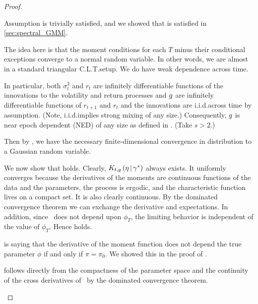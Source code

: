 \documentclass[11pt, letterpaper, twoside, final]{article}
\begin{document}
\begin{appendices}
\begin{proof}
\begin{proofpart}
\end{proofpart}

\begin{proofpart}
    \label{part:mainTheoremProofPart3}

    Assumption  is trivially satisfied,  and we showed that  is satisfied
    in \cref{sec:spectral_GMM}.  
        
    The idea here is that the moment conditions for each $T$ minus their conditional exceptions converge to a
    normal random variable.
    In other words, we are almost in a standard triangular C.L.T.\@ setup.
    We do have weak dependence across time.

    In particular, both $\sigma^2_t$ and $r_t$ are infinitely differentiable functions of the innovations to
    the volatility and return processes and $g$ are infinitely differentiable functions of $r_{t+1}$ and
    $r_t$ and the innovations are i.i.d.\@ across time by assumption.
    (Note, i.i.d.\@ implies strong mixing of any size.)
    Consequently, $g$ is near epoch dependent (NED) of any size as defined in
    \textcite{andrews1991empirical}.  
    (Take $s>2.$) 
    
    Then by \textcite[Theorem 3]{andrews1991empirical}, we have the necessary finite-dimensional convergence in
    distribution to a Gaussian random variable. 

    We now show that  holds.
    Clearly, $K_{t,g}\left(\eta \,\middle\vert\, \gamma^{*}\right)$ always exists.
    It uniformly converges because the derivatives of the moments are continuous functions of the data and the
    parameters, the process is ergodic, and the characteristic function lives on a compact set.
    It is also clearly continuous.
    By the dominated convergence theorem we can exchange the derivative and expectations.
    In addition, since \popmom\ does not depend upon $\phi_T$, the limiting behavior is independent of the value
    of $\phi_T$.
    Hence  holds.
    
     is saying that the derivative of the moment function does not depend the true parameter
    $\phi$ if and only if  $\pi =  \pi_0$. 
    We showed this in the proof of \label{mainTheoremProofPart2}.

     follows directly from the compactness of the parameter space and the continuity of the
    cross derivatives of \popmom\ by the dominated convergence theorem.


\end{proofpart}
\end{proof}
\end{appendices}
\end{document}
